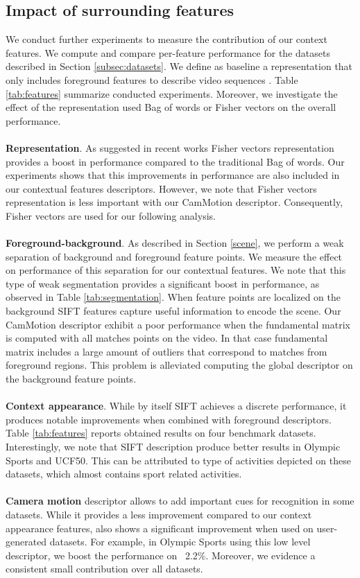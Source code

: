 \subsection{Impact of surrounding features}
We conduct further experiments to measure the contribution of our context features. We compute and compare per-feature performance for the datasets described in Section \ref{subsec:datasets}. We define as baseline a representation that only includes foreground features to describe video sequences \cite{wang2013}. Table \ref{tab:features} summarize conducted experiments. Moreover, we investigate the effect of the representation used \ie Bag of words or Fisher vectors on the overall performance. \\\\
\textbf{Representation}. As suggested in recent works \cite{perronnin2010, wang2013, xwang2013} Fisher vectors representation provides a boost in performance compared to the traditional Bag of words. Our experiments shows that this improvements in performance are also included in our contextual features descriptors. However, we note that Fisher vectors representation is less important with our CamMotion descriptor. Consequently, Fisher vectors are used for our following analysis.\\\\
\textbf{Foreground-background}. As described in Section \ref{scene}, we perform a weak separation of background and foreground feature points. We measure the effect on performance of this separation for our contextual features. We note that this type of weak segmentation provides a significant boost in performance, as observed in Table \ref{tab:segmentation}. When feature points are localized on the background SIFT features capture useful information to encode the scene. Our CamMotion descriptor exhibit a poor performance when the fundamental matrix is computed with all matches points on the video. In that case fundamental matrix includes a large amount of outliers that correspond to matches from foreground regions. This problem is alleviated computing the global descriptor on the background feature points. \\\\
\textbf{Context appearance}. While by itself SIFT achieves a discrete performance, it produces notable improvements when combined with foreground descriptors. Table \ref{tab:features} reports obtained results on four benchmark datasets. Interestingly, we note that SIFT description produce better results in Olympic Sports and UCF50. This can be attributed to type of activities depicted on these datasets, which almost contains sport related activities.\\\\
\textbf{Camera motion} descriptor allows to add important cues for recognition in some datasets. While it provides a less improvement compared to our context appearance features, also shows a significant improvement when used on user-generated datasets. For example, in Olympic Sports using this low level descriptor, we boost the performance on ~2.2\%. Moreover, we evidence a consistent small contribution over all datasets.

